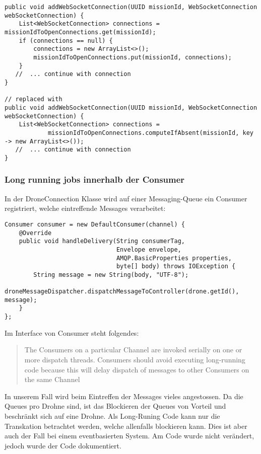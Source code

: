 \begin{lstlisting}
public void addWebSocketConnection(UUID missionId, WebSocketConnection webSocketConnection) {
    List<WebSocketConnection> connections = missionIdToOpenConnections.get(missionId);
    if (connections == null) {
        connections = new ArrayList<>();
        missionIdToOpenConnections.put(missionId, connections);
    }
   //  ... continue with connection
}

// replaced with
public void addWebSocketConnection(UUID missionId, WebSocketConnection webSocketConnection) {
    List<WebSocketConnection> connections =
            missionIdToOpenConnections.computeIfAbsent(missionId, key -> new ArrayList<>());
   //  ... continue with connection
}
\end{lstlisting}


\subsubsection{Long running jobs innerhalb der Consumer}
In der DroneConnection Klasse wird auf einer Messaging-Queue ein Consumer registriert, welche eintreffende Messages verarbeitet:
\begin{lstlisting}
Consumer consumer = new DefaultConsumer(channel) {
    @Override
    public void handleDelivery(String consumerTag,
                               Envelope envelope,
                               AMQP.BasicProperties properties,
                               byte[] body) throws IOException {
        String message = new String(body, "UTF-8");
        droneMessageDispatcher.dispatchMessageToController(drone.getId(), message);
    }
};
\end{lstlisting}

Im Interface von Consumer steht folgendes:
\begin{quote} 
The Consumers on a particular Channel are invoked serially on one or more dispatch threads. Consumers should avoid executing long-running code because this will delay dispatch of messages to other Consumers on the same Channel	
\end{quote}

In unserem Fall wird beim Eintreffen der Messages vieles angestossen. Da die Queues pro Drohne sind, ist das Blockieren der Queues von Vorteil und beschränkt sich auf eine Drohne. Als Long-Runing Code kann nur die Transkation betrachtet werden, welche allenfalls blockieren kann. Dies ist aber auch der Fall bei einem eventbasierten System. Am Code wurde nicht verändert, jedoch wurde der Code dokumentiert.

